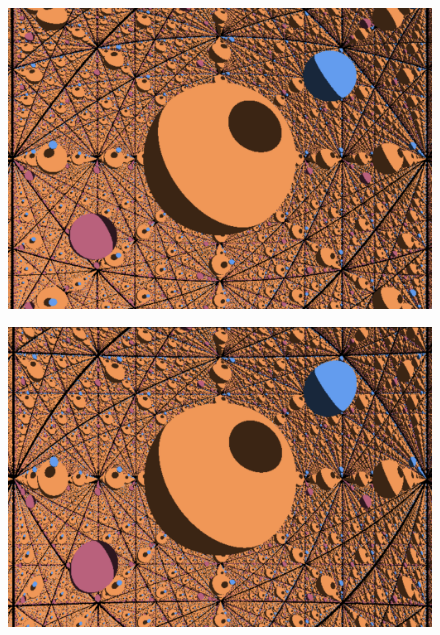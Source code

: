 \documentclass[titlepage]{article}
\begin{document}
\begin{figure}[H]
  \centering
  \begin{minipage}[t]{.4\textwidth}
    \centering
    \includegraphics[width=1\linewidth]{Images/Flat_torus_14mm_distorted.png}
    \label{fig:Torus distorted}
  \end{minipage}%
  \hspace{0.04\textwidth} %
  \begin{minipage}[t]{.4\textwidth}
    \centering
    \includegraphics[width=1\linewidth]{Images/Flat_torus_14mm_undistorted.png}
    \label{fig:Torus undistorted}
  \end{minipage}
  \end{figure}
\end{document}

